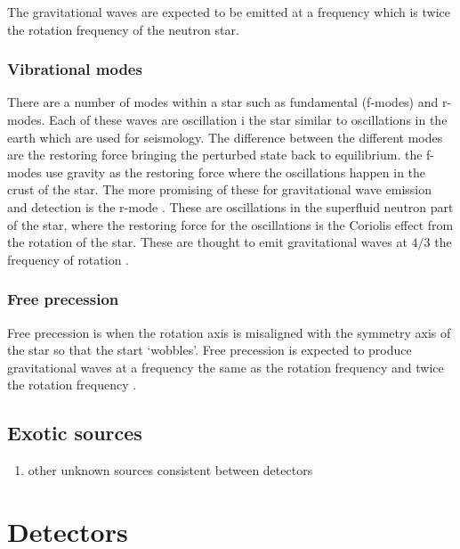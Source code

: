 The gravitational waves are expected to be emitted at a frequency which is twice the rotation frequency of the neutron star.
 
 \subsubsection{Vibrational modes}
There are a number of modes within a star such as fundamental (f-modes) and r-modes. 
Each of these waves are oscillation i the star similar to oscillations in the earth which are used for seismology.
The difference between the different modes are the restoring force bringing the perturbed state back to equilibrium.
the f-modes use gravity as the restoring force where the oscillations happen in the crust of the star.
The more promising of these for gravitational wave emission and detection is the r-mode \cite{Becker2009}.
These are oscillations in the superfluid neutron part of the star,
where the restoring force for the oscillations is the Coriolis effect from the rotation of the star.
These are thought to emit gravitational waves at $4/3$ the frequency of rotation \cite{Becker2009}.

\subsubsection{Free precession}

Free precession is when the rotation axis is misaligned with the symmetry axis of the star so that the start `wobbles'. 
Free precession is expected to produce gravitational waves at a frequency the same as the rotation frequency and twice the rotation frequency \cite{Becker2009}. 


\subsection{Exotic sources}

\begin{enumerate}
    \item other unknown sources consistent between detectors
\end{enumerate}

\section{\label{intro:detector}Detectors}


